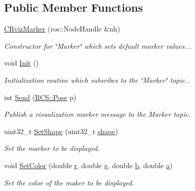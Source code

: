 \subsection*{Public Member Functions}
\begin{DoxyCompactItemize}
\item 
\hyperlink{classCRvizMarker_ab1733ac291c06bcf40d58f63415a358a}{C\-Rviz\-Marker} (ros\-::\-Node\-Handle \&nh)
\begin{DoxyCompactList}\small\item\em Constructor for \char`\"{}\-Marker\char`\"{} which sets default marker values... \end{DoxyCompactList}\item 
void \hyperlink{classCRvizMarker_a06a5319e1eecb94204c59a7d05e3da27}{Init} ()
\begin{DoxyCompactList}\small\item\em Initialization routine which subsribes to the \char`\"{}\-Marker\char`\"{} topic.. \end{DoxyCompactList}\item 
int \hyperlink{classCRvizMarker_a877d45842547db1ab1fea545e778d2b1}{Send} (\hyperlink{namespaceRCS_aa07e45d8a50e30064283d2b38087f999}{R\-C\-S\-::\-Pose} p)
\begin{DoxyCompactList}\small\item\em Publish a visualization marker message to the Marker topic. \end{DoxyCompactList}\item 
uint32\-\_\-t \hyperlink{classCRvizMarker_ac94e0f85f53d5d434e26546294d51869}{Set\-Shape} (uint32\-\_\-t \hyperlink{classCRvizMarker_ac71ec52d586b80a1f1fd7889871557c7}{shape})
\begin{DoxyCompactList}\small\item\em Set the marker to be displayed. \end{DoxyCompactList}\item 
void \hyperlink{classCRvizMarker_a8bf342bf1758f484ac9a6caf0fb3c86a}{Set\-Color} (double \hyperlink{classCRvizMarker_af9fab360283313338e57876dfd4f7053}{r}, double \hyperlink{classCRvizMarker_ad57f170c6e6757617c990c255c28ad3c}{g}, double \hyperlink{classCRvizMarker_aef6cbf7b2feda8b072863547c9c0719d}{b}, double \hyperlink{classCRvizMarker_a93c527fccbe4672668b497d5b4976704}{a})
\begin{DoxyCompactList}\small\item\em Set the color of the maker to be displayed. \end{DoxyCompactList}\end{DoxyCompactItemize}
